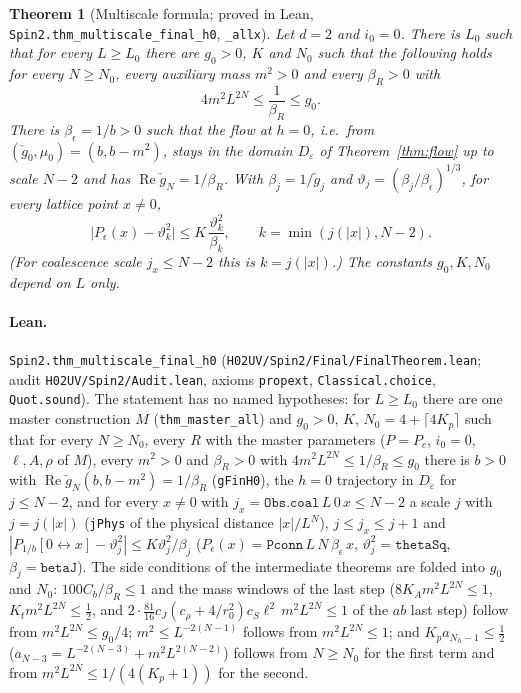 \documentclass[11pt]{amsart}
\newtheorem{theorem}{Theorem}[section]
\theoremstyle{definition}
\theoremstyle{remark}
\numberwithin{equation}{section}
\newcommand{\conn}{\leftrightarrow}
\begin{document}
\begin{theorem}[Multiscale formula; proved in Lean, \texttt{Spin2.thm\_multiscale\_final\_h0}, \texttt{\_allx}]\label{thm:multiscale}
Let $d=2$ and $i_0=0$. There is $L_0$ such that for every $L\ge L_0$ there are $g_0>0$, $K$ and $N_0$ such that the
following holds for every $N\ge N_0$, every auxiliary mass $m^2>0$ and every $\beta_R>0$ with
\[
  4m^2L^{2N}\le\frac1{\beta_R}\le g_0 .
\]
There is $\beta_\epsilon=1/b>0$ such that the flow at $h=0$, i.e.\ from $(\check g_0,\mu_0)=(b,b-m^2)$, stays in the
domain $D_\varepsilon$ of Theorem~\ref{thm:flow} up to scale $N-2$ and has $\operatorname{Re}\check g_N=1/\beta_R$. With
$\beta_j=1/\check g_j$ and $\vartheta_j=(\beta_j/\beta_\epsilon)^{1/3}$, for every lattice point $x\ne0$,
\[
  \bigl|P_\epsilon(x)-\vartheta_{k}^2\bigr|\le K\,\frac{\vartheta_{k}^2}{\beta_{k}},\qquad k=\min(j(|x|),N-2).
\]
(For coalescence scale $j_x\le N-2$ this is $k=j(|x|)$.)
The constants $g_0,K,N_0$ depend on $L$ only.
\end{theorem}
\paragraph{Lean.} \texttt{Spin2.thm\_multiscale\_final\_h0} (\texttt{H02UV/Spin2/Final/FinalTheorem.lean}; audit \texttt{H02UV/Spin2/Audit.lean},
axioms \texttt{propext}, \texttt{Classical.choice}, \texttt{Quot.sound}). The statement has no named hypotheses: for $L\ge L_0$ there
are one master construction $M$ (\texttt{thm\_master\_all}) and $g_0>0$, $K$, $N_0=4+\lceil4K_p\rceil$ such that for every $N\ge N_0$,
every $R$ with the master parameters ($P=P_c$, $i_0=0$, $\ell,A,\rho$ of $M$), every $m^2>0$ and $\beta_R>0$ with
$4m^2L^{2N}\le1/\beta_R\le g_0$ there is $b>0$ with $\operatorname{Re}\check g_N(b,b-m^2)=1/\beta_R$ (\texttt{gFinH0}), the $h=0$
trajectory in $D_\varepsilon$ for $j\le N-2$, and for every $x\ne0$ with $j_x=\texttt{Obs.coal}\,L\,0\,x\le N-2$ a scale $j$ with
$j=j(|x|)$ (\texttt{jPhys} of the physical distance $|x|/L^N$), $j\le j_x\le j+1$ and
$|P_{1/b}[0\conn x]-\vartheta_j^2|\le K\vartheta_j^2/\beta_j$ ($P_\epsilon(x)=\texttt{Pconn}\,L\,N\,\beta_\epsilon\,x$, $\vartheta_j^2=\texttt{thetaSq}$,
$\beta_j=\texttt{betaJ}$). The side conditions of the intermediate theorems are folded into $g_0$ and $N_0$: $100C_b/\beta_R\le1$ and
the mass windows of the last step ($8K_Am^2L^{2N}\le1$, $K_tm^2L^{2N}\le\frac12$, and
$2\cdot\frac{81}{16}c_J(c_\rho+4/r_0^2)c_S\ell^2\,m^2L^{2N}\le1$ of the $ab$ last step) follow from $m^2L^{2N}\le g_0/4$;
$m^2\le L^{-2(N-1)}$ follows from $m^2L^{2N}\le1$; and $K_pa_{N_h-1}\le\frac12$ ($a_{N-3}=L^{-2(N-3)}+m^2L^{2(N-2)}$) follows from
$N\ge N_0$ for the first term and from $m^2L^{2N}\le1/(4(K_p+1))$ for the second.
\end{document}
